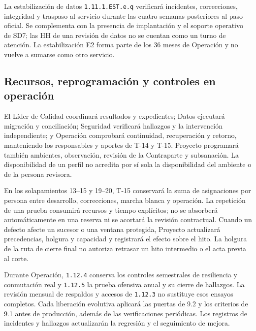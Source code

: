 La estabilización de datos \texttt{1.11.1.EST.e.q} verificará incidentes, correcciones, integridad y traspaso al servicio durante las cuatro semanas posteriores al paso oficial. Se complementa con la presencia de implantación y el soporte operativo de SD7; las HH de una revisión de datos no se cuentan como un turno de atención. La estabilización E2 forma parte de los 36 meses de Operación y no vuelve a sumarse como otro servicio. \parencite[Activación de grupos, convivencia y estabilización]{sd9-t18}

\subsection{Recursos, reprogramación y controles en operación}
El Líder de Calidad coordinará resultados y expedientes; Datos ejecutará migración y conciliación; Seguridad verificará hallazgos y la intervención independiente; y Operación comprobará continuidad, recuperación y retorno, manteniendo los responsables y aportes de T-14 y T-15. Proyecto programará también ambientes, observación, revisión de la Contraparte y subsanación. La disponibilidad de un perfil no acredita por sí sola la disponibilidad del ambiente o de la persona revisora. \parencites[Diccionario de gobierno, pruebas, formación y servicio]{sd9-t14}[sec.~7.2--7.3]{sd9-sd7}

En los solapamientos 13--15 y 19--20, T-15 conservará la suma de asignaciones por persona entre desarrollo, correcciones, marcha blanca y operación. La repetición de una prueba consumirá recursos y tiempo explícitos; no se absorberá automáticamente en una reserva ni se acortará la revisión contractual. Cuando un defecto afecte un sucesor o una ventana protegida, Proyecto actualizará precedencias, holgura y capacidad y registrará el efecto sobre el hito. La holgura de la ruta de cierre final no autoriza retrasar un hito intermedio o el acta previa al corte. \parencite[sec.~7.3, Red global, ruta crítica y holguras]{sd9-sd7}

Durante Operación, \texttt{1.12.4} conserva los controles semestrales de resiliencia y conmutación real y \texttt{1.12.5} la prueba ofensiva anual y su cierre de hallazgos. La revisión mensual de respaldos y accesos de \texttt{1.12.3} no sustituye esos ensayos completos. Cada liberación evolutiva aplicará las puertas de 9.2 y los criterios de 9.1 antes de producción, además de las verificaciones periódicas. Los registros de incidentes y hallazgos actualizarán la regresión y el seguimiento de mejora. \parencites[Diccionario de gobierno, pruebas, formación y servicio]{sd9-t14}[20.1, p.~34; RT-21.20, p.~38]{sd9-bt}
